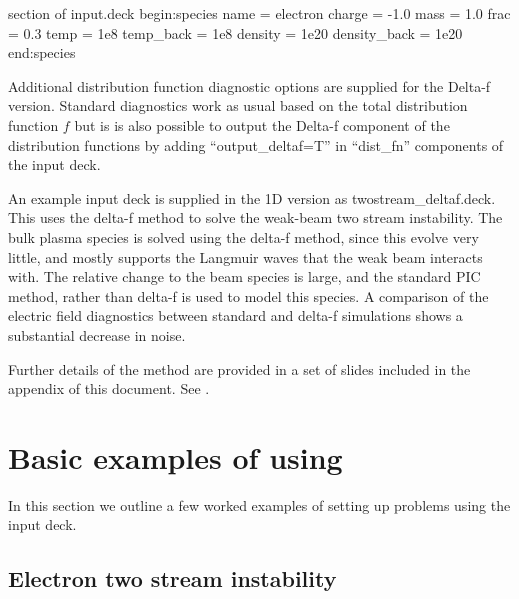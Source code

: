 \begin{lboxverbatim}{section of input.deck}
begin:species
   name = electron
   charge = -1.0
   mass  = 1.0
   frac = 0.3
   temp = 1e8
   temp_back = 1e8
   density = 1e20
   density_back = 1e20
end:species
\end{lboxverbatim}

Additional distribution function diagnostic options are supplied for the
Delta-f version. Standard diagnostics work as usual based on the total
distribution function $f$ but is is also possible to output the Delta-f
component of the distribution functions by adding ``output\_deltaf=T'' in
``dist\_fn'' components of the input deck.

An example input deck is supplied in the 1D {\EPOCH} version as
twostream\_deltaf.deck. This uses the delta-f method to solve the weak-beam
two stream instability. The bulk plasma species is solved using the delta-f
method, since this evolve very little, and mostly supports the Langmuir waves
that the weak beam interacts with. The relative change to the beam species is
large, and the standard PIC method, rather than delta-f is used to model this
species. A comparison of the electric field diagnostics between standard and
delta-f simulations shows a substantial decrease in noise.

Further details of the method are provided in a set of slides included in the
appendix of this document. See .

\section{Basic examples of using {\EPOCH}}
\label{sec:examples}

In this section we outline a few worked examples of setting up problems
using the {\EPOCH} input deck.

\subsection{Electron two stream instability}

